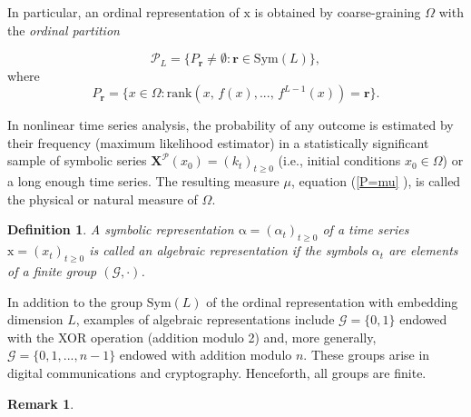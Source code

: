 \documentclass[%
 aip,
 amsmath,amssymb,
 reprint,%
]{revtex4-1}
\newtheorem{definition}[theorem]{Definition}
\newtheorem{remark}[theorem]{Remark}
\begin{document}
In particular, an ordinal representation of $\mathrm{x}$ is obtained by
coarse-graining $\Omega $ with the \textit{ordinal partition}

\begin{equation*}
\mathcal{P}_{L}=\{P_{\mathbf{r}}\neq \emptyset :\mathbf{r}\in \mathrm{Sym}(L)%
\mathcal{\}},
\end{equation*}%
where 
\begin{equation*}
P_{\mathbf{r}}=\{x\in \Omega :\mathrm{rank}(x,\,f(x),...,\,f^{L-1}(x))=%
\mathbf{r}\}.
\end{equation*}

In nonlinear time series analysis, the probability of any outcome is
estimated by their frequency (maximum likelihood estimator) in a
statistically significant sample of symbolic series $\mathbf{X}^{\mathcal{P}%
}(x_{0})=(k_{t})_{t\geq 0}$ (i.e., initial conditions $x_{0}\in \Omega $) or
a long enough time series. The resulting measure $\mu $, equation (\ref{P=mu}%
), is called \cite{Eckmann1985} the physical or natural measure of $\Omega $.

\begin{definition}
\label{DefAlgRep}A symbolic representation $\mathrm{\alpha }=(\alpha
_{t})_{t\geq 0}$ of a time series $\mathrm{x}=(x_{t})_{t\geq 0}$ is called
an \textit{algebraic representation} if the symbols $\alpha _{t}$ are
elements of a \textit{finite} group $(\mathcal{G},\cdot )$.
\end{definition}

In addition to the group $\mathrm{Sym}(L)$ of the ordinal representation
with embedding dimension $L$, examples of algebraic representations include $%
\mathcal{G=\{}0,1\mathcal{\}}$ endowed with the XOR operation (addition
modulo 2) and, more generally, $\mathcal{G=\{}0,1,...,n-1\mathcal{\}}$
endowed with addition modulo $n$. These groups arise in digital
communications and cryptography. Henceforth, all groups are finite.

\begin{remark}
\label{RemarkAlgRep}

\end{remark}
\end{document}
